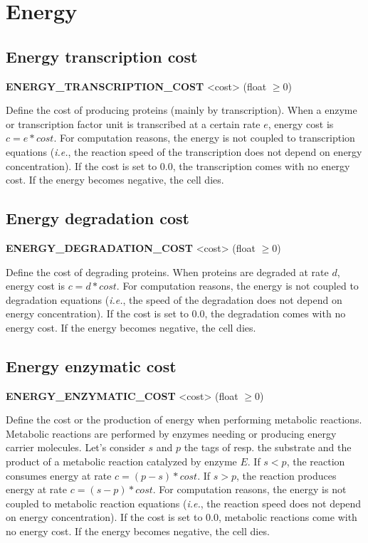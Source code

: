 
\section{Energy}

\subsection{Energy transcription cost}
\begin{center}
{\bf ENERGY\_TRANSCRIPTION\_COST} <cost> (float $\ge 0$)
\end{center}
Define the cost of producing proteins (mainly by transcription). When a enzyme or transcription factor unit is transcribed at a certain rate $e$, energy cost is $c = e*cost$. For computation reasons, the energy is not coupled to transcription equations (\textit{i.e.}, the reaction speed of the transcription does not depend on energy concentration). If the cost is set to 0.0, the transcription comes with no energy cost. If the energy becomes negative, the cell dies.


\subsection{Energy degradation cost}
\begin{center}
{\bf ENERGY\_DEGRADATION\_COST} <cost> (float $\ge 0$)
\end{center}
Define the cost of degrading proteins. When proteins are degraded at rate $d$, energy cost is $c = d*cost$. For computation reasons, the energy is not coupled to degradation equations (\textit{i.e.}, the speed of the degradation does not depend on energy concentration). If the cost is set to 0.0, the degradation comes with no energy cost. If the energy becomes negative, the cell dies.


\subsection{Energy enzymatic cost}
\begin{center}
{\bf ENERGY\_ENZYMATIC\_COST} <cost> (float $\ge 0$)
\end{center}
Define the cost or the production of energy when performing metabolic reactions. Metabolic reactions are performed by enzymes needing or producing energy carrier molecules. Let's consider $s$ and $p$ the tags of resp. the substrate and the product of a metabolic reaction catalyzed by enzyme $E$. If $s < p$, the reaction consumes energy at rate $c = (p-s)*cost$. If $s > p$, the reaction produces energy at rate $c = (s-p)*cost$. For computation reasons, the energy is not coupled to metabolic reaction equations (\textit{i.e.}, the reaction speed does not depend on energy concentration). If the cost is set to 0.0, metabolic reactions come with no energy cost. If the energy becomes negative, the cell dies.

